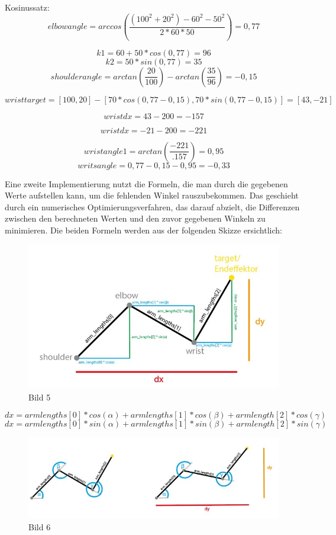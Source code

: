 \documentclass[12pt]{article}
\begin{document}
    Kosinussatz:
    \[
        elbowangle = arccos(\frac{(100^2 +20^2)-60^2-50^2}{2*60*50}) = 0,77
    \]

    \[
        k1 = 60 +50 * cos(0,77) = 96
    \]
    \[
        k2 = 50*sin(0,77) = 35
    \]
    \[
        shoulderangle = arctan(\frac{20}{100}) - arctan(\frac{35}{96}) = -0,15
    \]


    \[
        wristtarget = [100, 20] - [70 * cos(0,77 - 0,15), 70* sin(0,77 -0,15)] = [43, -21]
    \]

    \[
        wristdx = 43 - 200 = -157
    \]

    \[
        wristdx = -21 - 200 = -221
    \]

    \[
        wristangle1 = arctan(\frac{-221}{.157})= 0,95
    \]
    \[
        writsangle = 0,77 -0,15 -0,95 = -0,33
    \]

    Eine zweite Implementierung nutzt die Formeln, die man durch die gegebenen Werte aufstellen kann, um die fehlenden
    Winkel rauszubekommen. Das geschieht durch ein numerisches Optimierungsverfahren, das darauf abzielt, die Differenzen
    zwischen den berechneten Werten und den zuvor gegebenen Winkeln zu minimieren.
    Die beiden Formeln werden aus der folgenden Skizze ersichtlich:

    \begin{figure}[h]
        \centering
        \includegraphics[width = \linewidth]{Bild 5}
        \caption{Bild 5}
    \end{figure}

    \[
        dx = armlengths[0] * cos(\alpha) + armlengths[1] * cos(\beta) + armlength[2] * cos(\gamma)
    \]
    \[
        dx = armlengths[0] * sin(\alpha) + armlengths[1] * sin(\beta) + armlength[2] * sin(\gamma)
    \]

    \begin{figure}[h]
        \centering
        \includegraphics[width = \linewidth]{Bild 6}
        \caption{Bild 6}
    \end{figure}
\end{document}
